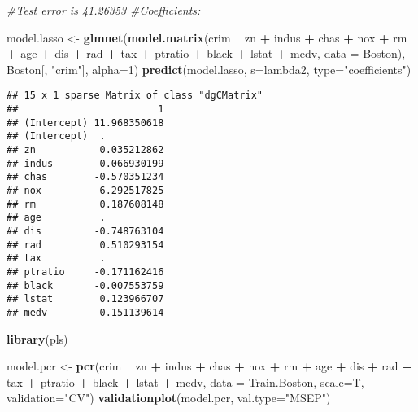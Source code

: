 \documentclass[
]{article}
\newenvironment{Shaded}{\begin{snugshade}}{\end{snugshade}}
\newcommand{\CommentTok}[1]{\textcolor[rgb]{0.56,0.35,0.01}{\textit{#1}}}
\newcommand{\DataTypeTok}[1]{\textcolor[rgb]{0.13,0.29,0.53}{#1}}
\newcommand{\DecValTok}[1]{\textcolor[rgb]{0.00,0.00,0.81}{#1}}
\newcommand{\KeywordTok}[1]{\textcolor[rgb]{0.13,0.29,0.53}{\textbf{#1}}}
\newcommand{\NormalTok}[1]{#1}
\newcommand{\OperatorTok}[1]{\textcolor[rgb]{0.81,0.36,0.00}{\textbf{#1}}}
\newcommand{\StringTok}[1]{\textcolor[rgb]{0.31,0.60,0.02}{#1}}
\begin{document}
\begin{Shaded}
\begin{Highlighting}[]
\CommentTok{#Test error is 41.26353}
\CommentTok{#Coefficients:}

\NormalTok{model.lasso <-}\StringTok{ }\KeywordTok{glmnet}\NormalTok{(}\KeywordTok{model.matrix}\NormalTok{(crim }\OperatorTok{~}\StringTok{ }\NormalTok{zn }\OperatorTok{+}\StringTok{ }\NormalTok{indus }\OperatorTok{+}\StringTok{ }\NormalTok{chas }\OperatorTok{+}\StringTok{ }\NormalTok{nox }\OperatorTok{+}\StringTok{ }\NormalTok{rm }\OperatorTok{+}\StringTok{ }\NormalTok{age }\OperatorTok{+}\StringTok{ }\NormalTok{dis }\OperatorTok{+}\StringTok{ }\NormalTok{rad }\OperatorTok{+}\StringTok{ }\NormalTok{tax }\OperatorTok{+}\StringTok{ }\NormalTok{ptratio }\OperatorTok{+}\StringTok{ }\NormalTok{black }\OperatorTok{+}\StringTok{ }\NormalTok{lstat }\OperatorTok{+}\StringTok{ }\NormalTok{medv, }\DataTypeTok{data =}\NormalTok{ Boston), Boston[, }\StringTok{"crim"}\NormalTok{], }\DataTypeTok{alpha=}\DecValTok{1}\NormalTok{)}
\KeywordTok{predict}\NormalTok{(model.lasso, }\DataTypeTok{s=}\NormalTok{lambda2, }\DataTypeTok{type=}\StringTok{"coefficients"}\NormalTok{)}
\end{Highlighting}
\end{Shaded}

\begin{verbatim}
## 15 x 1 sparse Matrix of class "dgCMatrix"
##                        1
## (Intercept) 11.968350618
## (Intercept)  .          
## zn           0.035212862
## indus       -0.066930199
## chas        -0.570351234
## nox         -6.292517825
## rm           0.187608148
## age          .          
## dis         -0.748763104
## rad          0.510293154
## tax          .          
## ptratio     -0.171162416
## black       -0.007553759
## lstat        0.123966707
## medv        -0.151139614
\end{verbatim}

\begin{Shaded}
\begin{Highlighting}[]
\KeywordTok{library}\NormalTok{(pls)}

\NormalTok{model.pcr <-}\StringTok{ }\KeywordTok{pcr}\NormalTok{(crim }\OperatorTok{~}\StringTok{ }\NormalTok{zn }\OperatorTok{+}\StringTok{ }\NormalTok{indus }\OperatorTok{+}\StringTok{ }\NormalTok{chas }\OperatorTok{+}\StringTok{ }\NormalTok{nox }\OperatorTok{+}\StringTok{ }\NormalTok{rm }\OperatorTok{+}\StringTok{ }\NormalTok{age }\OperatorTok{+}\StringTok{ }\NormalTok{dis }\OperatorTok{+}\StringTok{ }\NormalTok{rad }\OperatorTok{+}\StringTok{ }\NormalTok{tax }\OperatorTok{+}\StringTok{ }\NormalTok{ptratio }\OperatorTok{+}\StringTok{ }\NormalTok{black }\OperatorTok{+}\StringTok{ }\NormalTok{lstat }\OperatorTok{+}\StringTok{ }\NormalTok{medv, }\DataTypeTok{data =}\NormalTok{ Train.Boston, }\DataTypeTok{scale=}\NormalTok{T, }\DataTypeTok{validation=}\StringTok{"CV"}\NormalTok{)}
\KeywordTok{validationplot}\NormalTok{(model.pcr, }\DataTypeTok{val.type=}\StringTok{"MSEP"}\NormalTok{)}
\end{Highlighting}
\end{Shaded}
\end{document}
